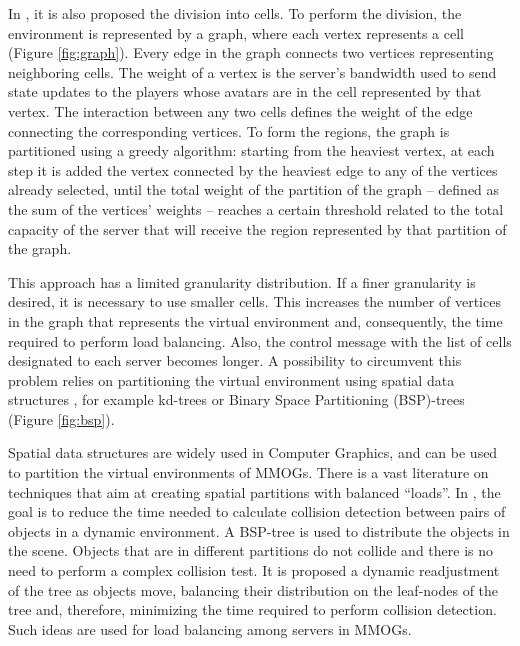 \documentclass[acmjacm]{acmtrans2m}
\newcommand{\figurecaption}{Figure}
\begin{document}
In \cite{bezerra2009lbs}, it is also proposed the division into cells. To perform the division, the environment is represented by a graph, where each vertex represents a cell (\figurecaption{} \ref{fig:graph}). Every edge in the graph connects two vertices representing neighboring cells. The weight of a vertex is the server's bandwidth used to send state updates to the players whose avatars are in the cell represented by that vertex. The interaction between any two cells defines the weight of the edge connecting the corresponding vertices. To form the regions, the graph is partitioned using a greedy algorithm: starting from the heaviest vertex, at each step it is added the vertex connected by the heaviest edge to any of the vertices already selected, until the total weight of the partition of the graph -- defined as the sum of the vertices' weights -- reaches a certain threshold related to the total capacity of the server that will receive the region represented by that partition of the graph.

This approach has a limited granularity distribution. If a finer granularity is desired, it is necessary to use smaller cells. This increases the number of vertices in the graph that represents the virtual environment and, consequently, the time required to perform load balancing. Also, the control message with the list of cells designated to each server becomes longer. A possibility to circumvent this problem relies on partitioning the virtual environment using spatial data structures \cite{bentley1975mbs}, for example
kd-trees or Binary Space Partitioning (BSP)-trees  
 (\figurecaption{} \ref{fig:bsp}).

Spatial data structures are widely used in Computer Graphics, and can be used to partition the virtual environments of MMOGs. There
is a vast literature on techniques that aim at creating spatial partitions with balanced ``loads''. In \cite{luque2005bpc}, the goal is to reduce the time needed to calculate collision detection between pairs of objects in a dynamic environment. A BSP-tree is used to distribute the objects in the scene. Objects that are in different partitions do not collide and there is no need to perform a complex collision test. It is proposed a dynamic readjustment of the tree as objects move, balancing their distribution on the leaf-nodes of the tree and, therefore, minimizing the time required to perform collision detection. Such ideas are used for load balancing among servers in MMOGs.
\end{document}
